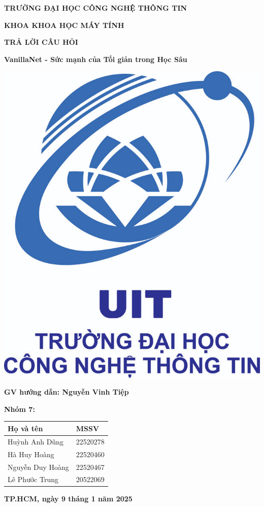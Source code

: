 \documentclass[a4paper,12pt]{report}
\begin{document}
\begin{titlepage}

\begin{center}

\textbf{TRƯỜNG ĐẠI HỌC CÔNG NGHỆ THÔNG TIN}

\textbf{KHOA KHOA HỌC MÁY TÍNH}

\vspace{1cm}

\textbf{TRẢ LỜI CÂU HỎI}

\vspace{1cm}

\textbf{VanillaNet - Sức mạnh của Tối giản trong Học Sâu}

\vspace{1cm}
\includegraphics[width=5 cm]{logo.png}
\vspace{1cm}

\textbf{GV hướng dẫn: Nguyễn Vinh Tiệp}

\vspace{1cm}

\textbf{Nhóm 7:}

\vspace{0.5cm}

\begin{tabular}{p{5cm}p{5cm}}
\hline
\textbf{Họ và tên} & \textbf{MSSV} \\
\hline
Huỳnh Anh Dũng & 22520278\\
\hline
Hà Huy Hoàng & 22520460 \\
\hline
Nguyễn Duy Hoàng & 22520467\\
\hline
Lê Phước Trung & 20522069 \\
\hline
\end{tabular}

\vspace{1cm}

\textbf{TP.HCM, ngày 9 tháng 1 năm 2025}

\end{center}

\end{titlepage}
\end{document}
